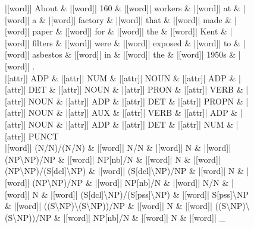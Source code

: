 \documentclass[10pt,a4paper]{article}
\begin{document}
\begin{figure}[h]
{\begin{dependency}[theme = simple]
\begin{deptext}[column sep=1em, row sep=0.1em]
|[word]| About \& |[word]| 160 \& |[word]| workers \& |[word]| at \& |[word]| a \& |[word]| factory \& |[word]| that \& |[word]| made \& |[word]| paper \& |[word]| for \& |[word]| the \& |[word]| Kent \& |[word]| filters \& |[word]| were \& |[word]| exposed \& |[word]| to \& |[word]| asbestos \& |[word]| in \& |[word]| the \& |[word]| 1950s \& |[word]| . \\
|[attr]| ADP \& |[attr]| NUM \& |[attr]| NOUN \& |[attr]| ADP \& |[attr]| DET \& |[attr]| NOUN \& |[attr]| PRON \& |[attr]| VERB \& |[attr]| NOUN \& |[attr]| ADP \& |[attr]| DET \& |[attr]| PROPN \& |[attr]| NOUN \& |[attr]| AUX \& |[attr]| VERB \& |[attr]| ADP \& |[attr]| NOUN \& |[attr]| ADP \& |[attr]| DET \& |[attr]| NUM \& |[attr]| PUNCT \\
|[word]| (N/N)/(N/N) \& |[word]| N/N \& |[word]| N \& |[word]| (NP\textbackslash{}NP)/NP \& |[word]| NP{[}nb{]}/N \& |[word]| N \& |[word]| (NP\textbackslash{}NP)/(S{[}dcl{]}\textbackslash{}NP) \& |[word]| (S{[}dcl{]}\textbackslash{}NP)/NP \& |[word]| N \& |[word]| (NP\textbackslash{}NP)/NP \& |[word]| NP{[}nb{]}/N \& |[word]| N/N \& |[word]| N \& |[word]| (S{[}dcl{]}\textbackslash{}NP)/(S{[}pss{]}\textbackslash{}NP) \& |[word]| S{[}pss{]}\textbackslash{}NP \& |[word]| ((S\textbackslash{}NP)\textbackslash{}(S\textbackslash{}NP))/NP \& |[word]| N \& |[word]| ((S\textbackslash{}NP)\textbackslash{}(S\textbackslash{}NP))/NP \& |[word]| NP{[}nb{]}/N \& |[word]| N \& |[word]| \_ \\
\end{deptext}




\end{dependency}}
\end{figure}
\end{document}
